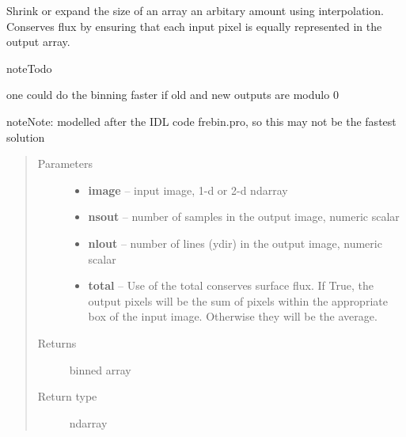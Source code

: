 \documentclass[a4paper,11pt,english]{sphinxmanual}
\begin{document}
\begin{fulllineitems}
\label{analysis:analysis.PSFcentroidingEffects.frebin}
Shrink or expand the size of an array an arbitary amount using interpolation.
Conserves flux by ensuring that each input pixel is equally represented
in the output array.

\begin{notice}{note}{Todo}

one could do the binning faster if old and new outputs are modulo 0
\end{notice}

\begin{notice}{note}{Note:}
modelled after the IDL code frebin.pro, so this may not be the fastest solution
\end{notice}
\begin{quote}\begin{description}
\item[{Parameters}] \leavevmode\begin{itemize}
\item {} 
\textbf{image} -- input image, 1-d or 2-d ndarray

\item {} 
\textbf{nsout} -- number of samples in the output image, numeric scalar

\item {} 
\textbf{nlout} -- number of lines (ydir) in the output image, numeric scalar

\item {} 
\textbf{total} -- Use of the total conserves surface flux. If True, the output pixels
will be the sum of pixels within the appropriate box of the input image.
Otherwise they will be the average.

\end{itemize}

\item[{Returns}] \leavevmode
binned array

\item[{Return type}] \leavevmode
ndarray

\end{description}\end{quote}

\end{fulllineitems}

\end{document}
